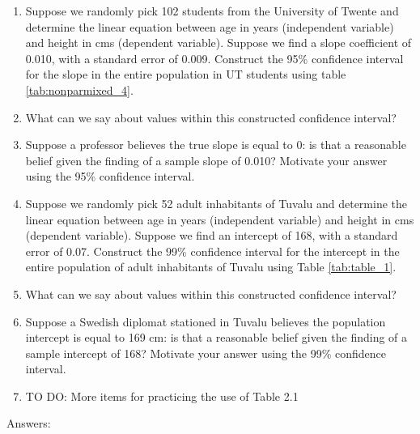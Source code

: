 \documentclass[]{report}\usepackage[]{graphicx}\usepackage[]{color}
\begin{document}
\begin{enumerate}


\item Suppose we randomly pick 102 students from the University of Twente and determine the linear equation between age in years (independent variable) and height in cms (dependent variable). Suppose we find a slope coefficient of 0.010, with a standard error of 0.009. Construct the 95\% confidence interval for the slope in the entire population in UT students using table \ref{tab:nonparmixed_4}.

\item What can we say about values within this constructed confidence interval?

\item Suppose a professor believes the true slope is equal to 0: is that a reasonable belief given the finding of a sample slope of 0.010? Motivate your answer using the 95\% confidence interval.


\item Suppose we randomly pick 52 adult inhabitants of Tuvalu and determine the linear equation between age in years (independent variable) and height in cms (dependent variable). Suppose we find an intercept of 168, with a standard error of 0.07. Construct the 99\% confidence interval for the intercept in the entire population of adult inhabitants of Tuvalu using Table \ref{tab:table_1}.

\item What can we say about values within this constructed confidence interval?

\item Suppose a Swedish diplomat stationed in Tuvalu believes the population intercept is equal to 169 cm: is that a reasonable belief given the finding of a sample intercept of 168? Motivate your answer using the 99\% confidence interval.


\item TO DO: More items for practicing the use of Table 2.1

\end{enumerate}


Answers:
\end{document}
